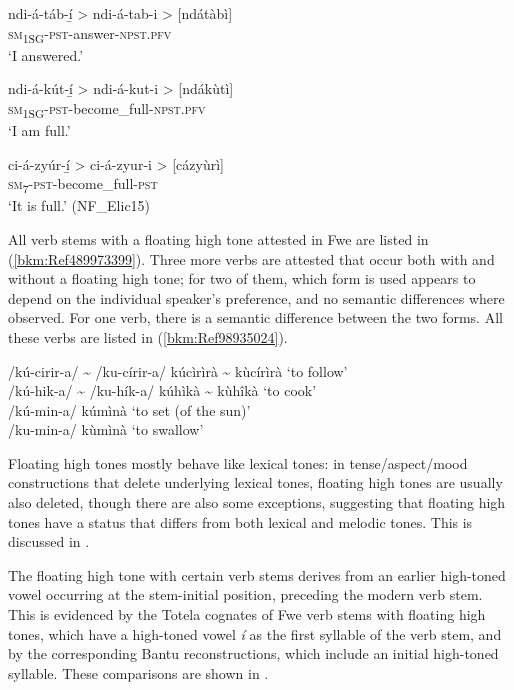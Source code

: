 \ea
\label{bkm:Ref98934963}
ndi-á-táb-í̲ > ndi-á-tab-i > [ndátàbì]\\
\textsc{sm}\textsubscript{1SG}-\textsc{pst}-answer-\textsc{npst}.\textsc{pfv}\\
\glt ‘I answered.’
\z

\ea
ndi-á-kút-í̲ > ndi-á-kut-i > [ndákùtì]\\
\textsc{sm}\textsubscript{1SG}-\textsc{pst}-become\_full-\textsc{npst}.\textsc{pfv}\\
\glt ‘I am full.’
\z

\ea
\label{bkm:Ref98934956}
ci-á-zyúr-í̲ > ci-á-zyur-i > [cázyùrì]\\
\textsc{sm}\textsubscript{7}-\textsc{pst}-become\_full-\textsc{pst} \\
\glt ‘It is full.’ (NF\_Elic15)
\z

All verb stems with a floating high tone attested in Fwe are listed in (\ref{bkm:Ref489973399}). Three more verbs are attested that occur both with and without a floating high tone; for two of them, which form is used appears to depend on the individual speaker’s preference, and no semantic differences where observed. For one verb, there is a semantic difference between the two forms. All these verbs are listed in (\ref{bkm:Ref98935024}).

\ea
{}
\label{bkm:Ref98935024}
/kú-cirir-a/ {\textasciitilde} /ku-círir-a/ \tab kúcìrìrà {\textasciitilde} kùcírìrà \tab ‘to follow’\\
/kú-hik-a/ {\textasciitilde} /ku-hík-a/ \tab kúhìkà {\textasciitilde} kùhîkà \tab ‘to cook’\\
/kú-min-a/ \tab kúmìnà \tab ‘to set (of the sun)’\\
/ku-min-a/ \tab kùmìnà \tab ‘to swallow’\\
\z

Floating high tones mostly behave like lexical tones: in tense/aspect/mood constructions that delete underly\-ing lexical tones, floating high tones are usually also deleted, though there are also some exceptions, suggesting that floating high tones have a status that differs from both lexical and melodic tones. This is discussed in .

The floating high tone with certain verb stems derives from an earlier high-toned vowel occurring at the stem-initial position, preceding the modern verb stem. This is evidenced by the Totela cognates of Fwe verb stems with floating high tones, which have a high-toned vowel \textit{í} as the first syllable of the verb stem, and by the corresponding Bantu reconstructions, which include an initial high-toned syllable. These comparisons are shown in .

